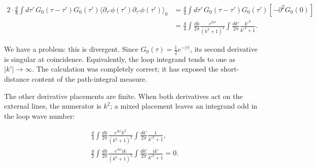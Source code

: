 \begin{equation}
 \begin{aligned}
 2\cdot\frac{g}{8}\int d\tau'\,
 G_0(\tau-\tau')G_0(\tau')
 \langle\partial_{\tau'}\phi(\tau')
 \partial_{\tau'}\phi(\tau')\rangle_0
 &=\frac{g}{4}\int d\tau'\,
 G_0(\tau-\tau')G_0(\tau')[-\partial^2G_0(0)]\\
 &=\frac{g}{4}\int\frac{dk}{2\pi}
 \frac{e^{ik\tau}}{(k^2+1)^2}
 \int\frac{dk'}{2\pi}\frac{k'^2}{k'^2+1}.
 \end{aligned}
 \label{eq:253a-divergent-derivative-contraction}
\end{equation}

We have a problem: this is divergent. Since $G_0(\tau)=\tfrac12e^{-|\tau|}$,
its second derivative is singular at coincidence. Equivalently, the loop
integrand tends to one as $|k'|\to\infty$. The calculation was completely
correct; it has exposed the short-distance content of the path-integral
measure.

The other derivative placements are finite. When both derivatives act on the
external lines, the numerator is $k^2$; a mixed placement leaves an integrand
odd in the loop wave number:

\begin{equation}
 \begin{aligned}
 &\frac{g}{4}\int\frac{dk}{2\pi}
 \frac{e^{ik\tau}k^2}{(k^2+1)^2}
 \int\frac{dk'}{2\pi}\frac{1}{k'^2+1},\\
 &\frac{g}{2}\int\frac{dk}{2\pi}
 \frac{e^{ik\tau}ik}{(k^2+1)^2}
 \int\frac{dk'}{2\pi}\frac{ik'}{k'^2+1}=0.
 \end{aligned}
 \label{eq:253a-finite-derivative-contractions}
\end{equation}


